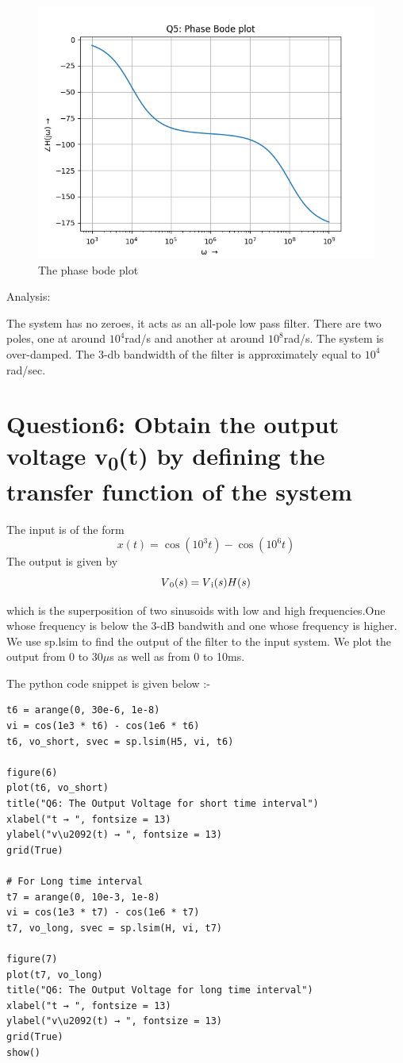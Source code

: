 \documentclass[11pt, a4paper]{article}
\begin{document}
\begin{figure}[!tbh]
 \centering
 \includegraphics[scale=0.6]{Ass6_Figure_5.png}  
 \caption{The phase bode plot}
\end{figure}
\cleardoublepage

Analysis:

The system has no zeroes, it acts as an all-pole low pass filter. There are two poles, one at around $10^4$rad/s and another at around $10^8$rad/s. The system is over-damped. The 3-db bandwidth of the filter is approximately equal to $10^4$rad/sec.

\section{Question6: Obtain the output voltage v\textsubscript{0}(t) by defining the  transfer function of the system}

The input is of the form
\[x(t) = \cos{(10^3t)}-\cos{(10^6t)} \]
The output is given by
\[V\textsubscript{0}(s) =V\textsubscript{i}(s)H(s)\]


which is the superposition of two sinusoids with low and high frequencies.One whose frequency is below the 3-dB bandwith and one whose frequency is higher.
We use sp.lsim to find the output of the filter to the input system.
We plot the output from 0 to 30$\mu$s as well as from 0 to 10ms.

The python code snippet is given below :-
\begin{verbatim}
t6 = arange(0, 30e-6, 1e-8)
vi = cos(1e3 * t6) - cos(1e6 * t6)
t6, vo_short, svec = sp.lsim(H5, vi, t6)

figure(6) 
plot(t6, vo_short)
title("Q6: The Output Voltage for short time interval")
xlabel("t → ", fontsize = 13)
ylabel("v\u2092(t) → ", fontsize = 13)
grid(True)

# For Long time interval
t7 = arange(0, 10e-3, 1e-8)
vi = cos(1e3 * t7) - cos(1e6 * t7)
t7, vo_long, svec = sp.lsim(H, vi, t7)

figure(7)
plot(t7, vo_long)
title("Q6: The Output Voltage for long time interval")
xlabel("t → ", fontsize = 13)
ylabel("v\u2092(t) → ", fontsize = 13)
grid(True)
show()
\end{verbatim}
\cleardoublepage
\end{document}
